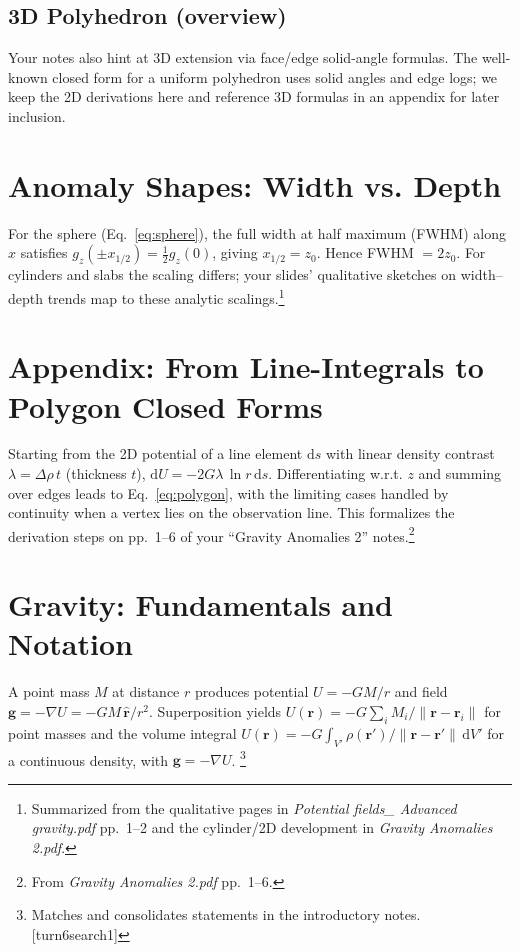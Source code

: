 \documentclass[11pt,a4paper]{article}
\begin{document}
\subsection{3D Polyhedron (overview)}
Your notes also hint at 3D extension via face/edge solid-angle formulas. The well-known closed form for a uniform polyhedron uses solid angles and edge logs; we keep the 2D derivations here and reference 3D formulas in an appendix for later inclusion.

\section{Anomaly Shapes: Width vs. Depth}
For the sphere (Eq.~\ref{eq:sphere}), the full width at half maximum (FWHM) along $x$ satisfies $g_z(\pm x_{1/2})=\tfrac12 g_z(0)$, giving $x_{1/2}=z_0$. Hence FWHM $=2z_0$. For cylinders and slabs the scaling differs; your slides' qualitative sketches on width--depth trends map to these analytic scalings.\footnote{Summarized from the qualitative pages in \emph{Potential fields\_ Advanced gravity.pdf} pp.~1--2 and the cylinder/2D development in \emph{Gravity Anomalies 2.pdf}.}

\section{Appendix: From Line-Integrals to Polygon Closed Forms}
Starting from the 2D potential of a line element $\mathrm{d}s$ with linear density contrast $\lambda=\Delta\rho\,t$ (thickness $t$), 
$\mathrm{d}U = -2G\lambda\,\ln r\,\mathrm{d}s$. Differentiating w.r.t. $z$ and summing over edges leads to Eq.~\eqref{eq:polygon}, with the limiting cases handled by continuity when a vertex lies on the observation line. This formalizes the derivation steps on pp.~1--6 of your “Gravity Anomalies 2” notes.\footnote{From \emph{Gravity Anomalies 2.pdf} pp.~1--6.}


\section{Gravity: Fundamentals and Notation}
A point mass $M$ at distance $r$ produces potential $U=-GM/r$ and field $\mathbf{g}=-\nabla U= -GM\,\hat{\mathbf{r}}/r^2$. Superposition yields $U(\mathbf{r})=-G\sum_i M_i/\|\mathbf{r}-\mathbf{r}_i\|$ for point masses and the volume integral $U(\mathbf{r})=-G \int_{V'} \rho(\mathbf{r'})/\|\mathbf{r}-\mathbf{r'}\|\,\mathrm{d}V'$ for a continuous density, with $\mathbf{g}=-\nabla U$.
\footnote{Matches and consolidates statements in the introductory notes. [turn6search1]}
\end{document}
